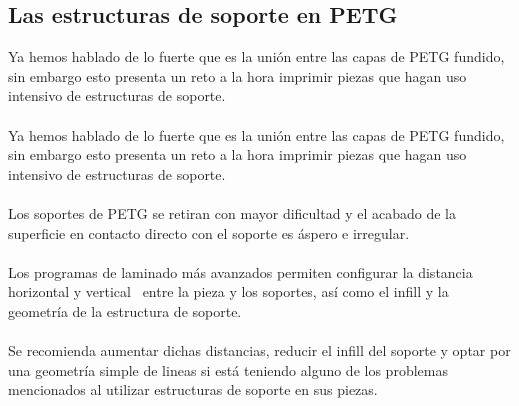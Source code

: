 \documentclass[11pt,a4paper]{article}
\begin{document}
	\subsection{Las estructuras de soporte en PETG}Ya hemos hablado de lo fuerte que es la unión entre las capas de PETG fundido, sin embargo esto presenta un reto a la hora imprimir piezas que hagan uso intensivo de estructuras de soporte.
\\\\
Ya hemos hablado de lo fuerte que es la unión entre las capas de PETG fundido, sin embargo esto presenta un reto a la hora imprimir piezas que hagan uso intensivo de estructuras de soporte.
\\\\
Los soportes de PETG se retiran con mayor dificultad y el acabado de la superficie en contacto directo con el soporte es áspero e irregular.
\\\\
Los programas de laminado más avanzados permiten configurar la distancia horizontal y vertical  entre la pieza y los soportes, así como el infill y la geometría de la estructura de soporte.
\\\\
Se recomienda aumentar dichas distancias, reducir el infill del soporte y optar por una geometría simple de lineas si está teniendo alguno de los problemas mencionados al utilizar estructuras de soporte en sus piezas.
\end{document}
